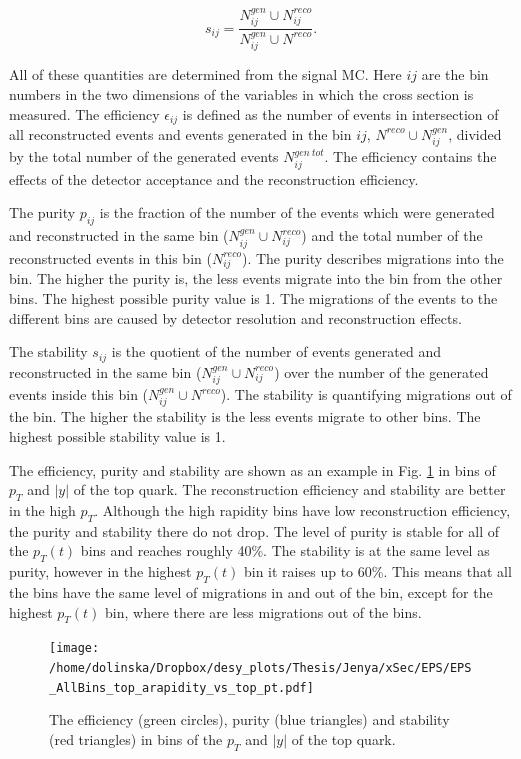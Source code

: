 \begin{equation}
 s_{ij} = \frac{N_{ij}^{gen} \cup N_{ij}^{reco}}{N_{ij}^{gen} \cup N^{reco}}.
\end{equation}

All of these quantities are determined from the signal MC. Here $ij$ are the bin numbers in the two dimensions of the variables in which
the cross section is measured. The efficiency 
$\epsilon_{ij}$ is defined as the number of events in intersection of all reconstructed events and events generated in the bin $ij$, 
$N^{reco} \cup N_{ij}^{gen}$, divided by the total number of the generated events $N_{ij}^{gen\:tot}$. 
The efficiency contains the effects of the detector acceptance and the reconstruction efficiency.

The purity $p_{ij}$ is the fraction of the number of the events which were generated and reconstructed in the same bin ($N_{ij}^{gen} \cup N_{ij}^{reco}$)
and the total number of the reconstructed events in this bin ($N_{ij}^{reco}$). The purity describes migrations into the bin.
The higher the purity is, the less events migrate into the bin from the other bins. The highest possible purity value is 1.
The migrations of the events to the different bins are caused by detector resolution and reconstruction effects.

The stability $s_{ij}$ is the quotient of the number of events generated and reconstructed in the same bin ($N_{ij}^{gen} \cup N_{ij}^{reco}$) over the 
number of the generated events inside this bin ($N_{ij}^{gen} \cup N^{reco}$). The stability is quantifying migrations out of the bin. The higher 
the stability is the less events migrate to other bins. The highest possible stability value is 1.

The efficiency, purity and stability are shown as an example in Fig. \ref{fig:EPS_2D_y_pt} in bins of $p_{T}$ and $|y|$ of the top quark. The 
reconstruction efficiency and stability are better in the high $p_{T}$. Although the high rapidity bins have low reconstruction efficiency, 
the purity and stability there do not drop. The level of purity is stable for all of the $p_{T}(t)$ bins and reaches roughly 40\%. The 
stability is at the same level as purity, however in the highest $p_{T}(t)$ bin it raises up to 60\%. This means that all the bins have the 
same level of migrations in and out of the bin, except for the highest $p_{T}(t)$ bin, where there are less migrations out of the bins.

\begin{figure}[t]
  \centering
  \texttt{[image: /home/dolinska/Dropbox/desy\_plots/Thesis/Jenya/xSec/EPS/EPS\_AllBins\_top\_arapidity\_vs\_top\_pt.pdf]}
  \caption{The efficiency (green circles), purity (blue triangles) and stability (red triangles) in bins of the $p_{T}$ and $|y|$ of the top quark.}
  \label{fig:EPS_2D_y_pt}
\end{figure}

